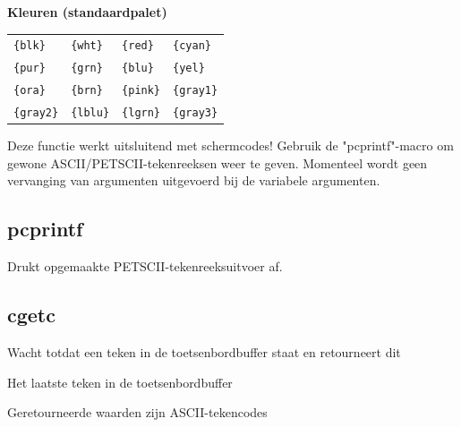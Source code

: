 \begin{description}[leftmargin=2.4cm,style=nextline]
\begin{description}
{\textbf{Kleuren (standaardpalet)} \\
    \begin{tabular}{llll}
\texttt{\{blk\}}  & \texttt{\{wht\}}  &  \texttt{\{red\}} &   \texttt{\{cyan\}}  \\    \texttt{\{pur\}}  & \texttt{\{grn\}}  &  \texttt{\{blu\}} & \texttt{\{yel\}}
   \\
\texttt{\{ora\}}  & \texttt{\{brn\}}  &  \texttt{\{pink\}} &   \texttt{\{gray1\}} \\ \texttt{\{gray2\}} &  \texttt{\{lblu\}} &   \texttt{\{lgrn\}} & \texttt{\{gray3\}}

    \end{tabular}

    }
\end{description}
\item [Opmerkingen:] {Deze functie werkt uitsluitend met schermcodes! Gebruik de "pcprintf"-macro om gewone ASCII/PETSCII-tekenreeksen weer te geven. Momenteel wordt geen vervanging van argumenten uitgevoerd bij de variabele argumenten.}
\end{description}

\subsection{pcprintf}
\begin{description}[leftmargin=2.4cm,style=nextline]
\item [Beschrijving:] {Drukt opgemaakte PETSCII-tekenreeksuitvoer af.}\item [Syntaxis:] 
\end{description}

\subsection{cgetc}
\begin{description}[leftmargin=2.4cm,style=nextline]
\item [Beschrijving:] { Wacht totdat een teken in de toetsenbordbuffer staat en retourneert dit }\item [Syntaxis:] \item [Resultaat:] {Het laatste teken in de toetsenbordbuffer }\item [Opmerkingen:] {Geretourneerde waarden zijn ASCII-tekencodes}
\end{description}

